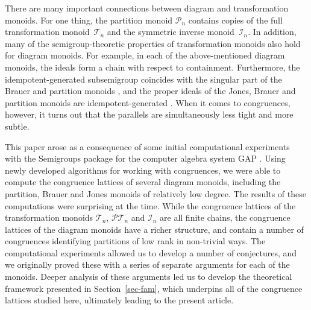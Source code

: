 \documentclass[11pt,a4paper]{article}
\newcommand{\PT}{\mathcal P\mathcal T}
\newcommand{\I}{\mathcal I}
\newcommand{\T}{\mathcal T}
\renewcommand{\P}{\mathcal P}
\newcommand{\1}{\id_n}
\numberwithin{equation}{section}
\theoremstyle{definition}
\begin{document}
There are many important connections between diagram and transformation
monoids.  For one thing, the partition monoid $\P_n$ contains copies of the
full transformation monoid~$\T_n$ and the symmetric inverse monoid~$\I_n$.  In
addition, many of the semigroup-theoretic properties of transformation monoids
also hold for diagram monoids.  For example, in each of the above-mentioned
diagram monoids, the ideals form a chain with respect to containment.
Furthermore, the idempotent-generated subsemigroup coincides with the singular
part of the Brauer and partition monoids \cite{JEpnsn,MM2007}, and the proper
ideals of the Jones, Brauer and partition monoids are idempotent-generated
\cite{EG2017}.
%
When it comes to congruences, however, it turns out that the parallels are
simultaneously less tight and more subtle.  

This paper arose as a consequence
of some initial computational experiments with the Semigroups package
for the computer algebra system GAP \cite{GAP}.  Using newly developed
algorithms for working with congruences, we were able to compute the congruence
lattices of several diagram monoids, including the partition, Brauer and Jones
monoids of relatively low degree.  The results of these computations were
surprising at the time.  While the congruence lattices of the transformation
monoids $\T_n$, $\PT_n$ and $\I_n$ are all finite chains, the congruence
lattices of the diagram monoids have a richer structure, and contain a number
of congruences identifying partitions of low {rank} in non-trivial ways.
%
The computational experiments allowed us to develop a number of conjectures, and we originally proved these with a series of separate arguments for each of the monoids.  Deeper analysis of these arguments led us to develop the theoretical framework presented in Section~\ref{sec-fam}, which underpins all of the congruence lattices studied here, ultimately leading to the present article.
\end{document}
